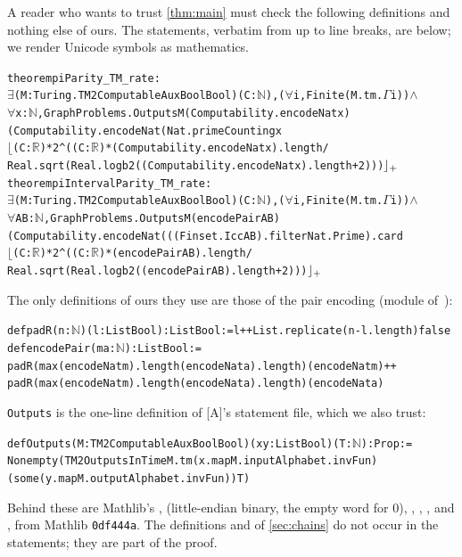 \documentclass[10pt]{amsart}
\theoremstyle{plain}
\theoremstyle{definition}
\theoremstyle{remark}
\numberwithin{equation}{section}
\newcommand{\A}{\textup{[A]}}
\begin{document}
A reader who wants to trust \cref{thm:main} must check the following definitions and nothing else of
ours. The statements, verbatim from  up to line breaks, are below; we render Unicode
symbols as mathematics.
\begin{alltt}\footnotesize
theorem piParity_TM_rate :
    \(\exists\) (M : Turing.TM2ComputableAux Bool Bool) (C : \(\mathbb{N}\)), (\(\forall\) i, Finite (M.tm.\(\Gamma\) i)) \(\wedge\)
      \(\forall\) x : \(\mathbb{N}\), GraphProblems.Outputs M (Computability.encodeNat x)
        (Computability.encodeNat (Nat.primeCounting x %
        \(\lfloor\)(C : \(\mathbb{R}\)) * 2 ^ ((C : \(\mathbb{R}\)) * (Computability.encodeNat x).length /
          Real.sqrt (Real.logb 2 ((Computability.encodeNat x).length + 2)))\(\rfloor\sb{+}\)
theorem piIntervalParity_TM_rate :
    \(\exists\) (M : Turing.TM2ComputableAux Bool Bool) (C : \(\mathbb{N}\)), (\(\forall\) i, Finite (M.tm.\(\Gamma\) i)) \(\wedge\)
      \(\forall\) A B : \(\mathbb{N}\), GraphProblems.Outputs M (encodePair A B)
        (Computability.encodeNat (((Finset.Icc A B).filter Nat.Prime).card %
        \(\lfloor\)(C : \(\mathbb{R}\)) * 2 ^ ((C : \(\mathbb{R}\)) * (encodePair A B).length /
          Real.sqrt (Real.logb 2 ((encodePair A B).length + 2)))\(\rfloor\sb{+}\)
\end{alltt}
The only definitions of ours they use are those of the pair encoding (module 
of~\cite{TulCN26}):
\begin{alltt}\footnotesize
def padR (n : \(\mathbb{N}\)) (l : List Bool) : List Bool := l ++ List.replicate (n - l.length) false
def encodePair (m a : \(\mathbb{N}\)) : List Bool :=
  padR (max (encodeNat m).length (encodeNat a).length) (encodeNat m) ++
    padR (max (encodeNat m).length (encodeNat a).length) (encodeNat a)
\end{alltt}
\texttt{Outputs} is the one-line definition of \A's statement file, which we also trust:
\begin{alltt}\footnotesize
def Outputs (M : TM2ComputableAux Bool Bool) (x y : List Bool) (T : \(\mathbb{N}\)) : Prop :=
  Nonempty (TM2OutputsInTime M.tm (x.map M.inputAlphabet.invFun)
    (some (y.map M.outputAlphabet.invFun)) T)
\end{alltt}
Behind these are Mathlib's ,  (little-endian
binary, the empty word for $0$), , , ,
 and , from Mathlib \texttt{0df444a}. The definitions 
and  of \cref{sec:chains} do not occur in the statements; they are part of the proof.
\end{document}
